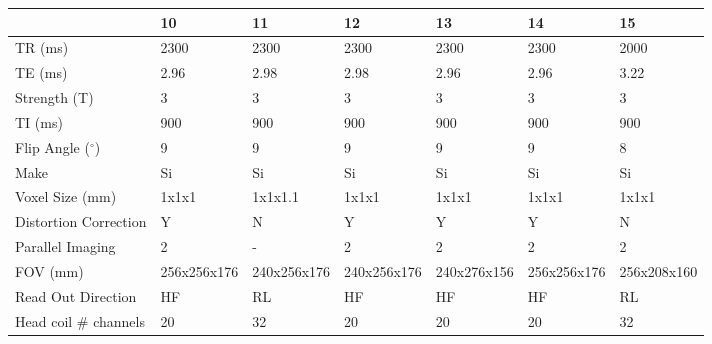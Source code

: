 \documentclass{article}
\begin{document}
\begin{table}
\centering
\iflatexml
\begin{tabular}{lllllll}
\toprule
{} & 10 & 11 & 12 & 13 & 14 & 15 \\
\midrule
TR (ms)                   &                 2300 &                 2300 &               2300 &                2300 &                2300 &                2000 \\
TE (ms)                   &                 2.96 &                 2.98 &               2.98 &                2.96 &                2.96 &                3.22 \\
Strength (T)              &                    3 &                    3 &                  3 &                   3 &                   3 &                   3 \\
TI (ms)                   &                  900 &                  900 &                900 &                 900 &                 900 &                 900 \\
Flip Angle ($^\circ$)            &                    9 &                    9 &                  9 &                   9 &                   9 &                   8 \\
Make                  &                   Si &                   Si &                 Si &                  Si &                  Si &                  Si \\
Voxel Size (mm)            &                1x1x1 &              1x1x1.1 &              1x1x1 &               1x1x1 &               1x1x1 &               1x1x1 \\
Distortion Correction &                    Y &                    N &                  Y &                   Y &                   Y &                   N \\
Parallel Imaging      &                    2 &                    - &                  2 &                   2 &                   2 &                   2 \\
FOV (mm)                  &          256x256x176 &          240x256x176 &        240x256x176 &         240x276x156 &         256x256x176 &         256x208x160 \\
Read Out Direction    &                   HF &                   RL &                 HF &                  HF &                  HF &                  RL \\
Head coil \# channels  &                   20 &                   32 &                 20 &                  20 &                  20 &                  32 \\

\end{tabular}
\end{table}
\end{document}
